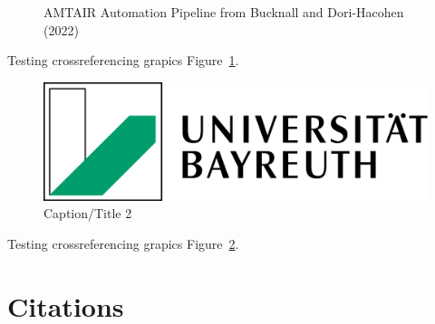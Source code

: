 \documentclass[
  letterpaper,
]{book}
\begin{document}
\begin{figure}


\caption[Five-step AMTAIR automation pipeline from PDFs to Bayesian
networks]{\label{fig-automation_pipeline}AMTAIR Automation Pipeline from
Bucknall and Dori-Hacohen (2022)}

\end{figure}%

Testing crossreferencing grapics Figure~\ref{fig-automation_pipeline}.

\begin{figure}

\includegraphics[width=0.3\linewidth,height=\textheight,keepaspectratio]{images/cover.png}

\caption[Short 2 caption]{\label{fig-testgraphic2}Caption/Title 2}

\end{figure}%

Testing crossreferencing grapics Figure~\ref{fig-testgraphic2}.

\section*{Citations}\label{sec-citations}
\end{document}
